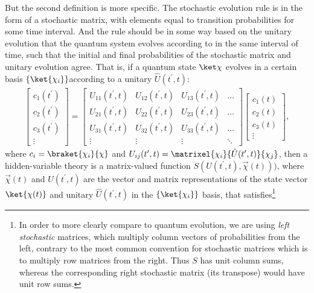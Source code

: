 But the second definition is more specific. The stochastic evolution rule is in the form of a stochastic matrix, with elements equal to transition probabilities for some time interval. And the rule should be in some way based on the unitary evolution that the quantum system evolves according to in the same interval of time, such that the initial and final probabilities of the stochastic matrix and unitary evolution agree. That is, if a quantum state $\ket\chi$ evolves in a certain basis $\{\ket{\chi_i}\}$according to a unitary $\hat U(t^\prime, t)$:
\begin{align}
\left[\begin{matrix}
c_1(t^\prime)\\c_2(t^\prime)\\c_3(t^\prime)\\\vdots
\end{matrix}\right]
= \left[\begin{matrix}
U_{11}(t^\prime, t) & U_{12}(t^\prime, t) & U_{13}(t^\prime, t)&\hdots\\
U_{21}(t^\prime, t) & U_{22}(t^\prime, t) & U_{23}(t^\prime, t)&\hdots\\
U_{31}(t^\prime, t) & U_{32}(t^\prime, t) & U_{33}(t^\prime, t)&\hdots\\
\vdots & \vdots & \vdots & \ddots
\end{matrix}\right]
\left[\begin{matrix}
c_1(t)\\c_2(t)\\c_3(t)\\\vdots
\end{matrix}\right],
\end{align}
where $c_i = \braket{\chi_i}{\chi}$ and $U_{ij}(t^\prime, t) = \matrixel{\chi_i}{\hat U(t^\prime, t)}{\chi_j}$, then a hidden-variable theory is a matrix-valued function $S(U(t^\prime, t), \vec\chi(t)))$, where $\vec\chi(t)$ and $U(t^\prime, t)$ are the vector and matrix representations of the state vector $\ket{\chi(t)}$ and unitary $\hat U(t^\prime, t)$ in the $\{\ket{\chi_i}\}$ basis, that satisfies\footnote{In order to more clearly compare to quantum evolution, we are using \emph{left stochastic} matrices, which multiply column vectors of probabilities from the left, contrary to the most common convention for stochastic matrices which is to multiply row matrices from the right. Thus $S$ has unit column sums, whereas the corresponding right stochastic matrix (its transpose) would have unit row sums.}
